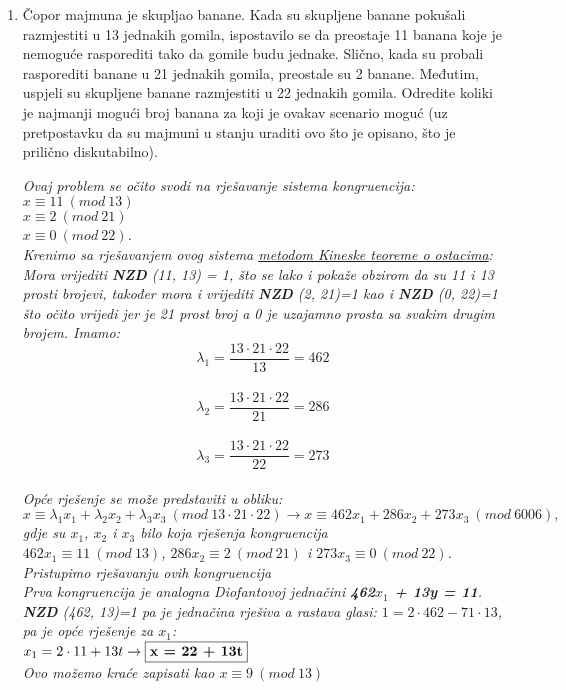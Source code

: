 \documentclass[12pt]{article}
\begin{document}
\begin{enumerate}
	    \item Čopor majmuna je skupljao banane. Kada su skupljene banane pokušali razmjestiti u 13 jednakih gomila, ispostavilo se da preostaje 11 banana koje je nemoguće rasporediti tako da gomile budu jednake. Slično, kada su probali rasporediti banane u 21 jednakih gomila, preostale su 2 banane. Međutim, uspjeli su skupljene banane razmjestiti u 22 jednakih gomila. Odredite koliki je najmanji mogući broj banana za koji je ovakav scenario moguć (uz pretpostavku da su majmuni u stanju uraditi ovo što je opisano, što je prilično diskutabilno).
        \begin{center}
        \textit{Ovaj problem se očito svodi na rješavanje sistema kongruencija:\\$x \equiv 11\ (mod\ 13)$\\$x \equiv 2\ (mod\ 21)$\\$x \equiv 0\ (mod\ 22)$.}\\
        \vspace*{0.75cm}
            \textit{Krenimo sa rješavanjem ovog sistema \underline{metodom Kineske teoreme o ostacima}:\\Mora vrijediti \textbf{NZD} (11, 13) = 1, što se lako i pokaže obzirom da su 11 i 13 prosti brojevi, također mora i vrijediti  \textbf{NZD} (2, 21)=1 kao i  \textbf{NZD} (0, 22)=1 što očito vrijedi jer je 21 prost broj a 0 je uzajamno prosta sa svakim drugim brojem. Imamo:\\$$\lambda_1 = \frac{13 \cdot 21 \cdot 22}{13} = 462$$\\$$\lambda_2 = \frac{13 \cdot 21 \cdot 22}{21} = 286$$\\$$\lambda_3 = \frac{13 \cdot 21 \cdot 22}{22} = 273$$\\Opće rješenje se može predstaviti u obliku: \\$x\equiv \lambda_1 x_1 + \lambda_2 x_2 + \lambda_3 x_3\ (mod\ 13\cdot21\cdot22) \rightarrow x \equiv 462x_1 + 286x_2 + 273x_3\ (mod\ 6006),$ gdje su $x_1$, $x_2$ i $x_3$ bilo koja rješenja kongruencija \\ $462x_1 \equiv 11\ (mod\ 13)$, $286x_2 \equiv 2\ (mod\ 21)$ i $273x_3 \equiv 0\ (mod\ 22)$.\\}
             \vspace*{0.75cm}
            \textit{Pristupimo rješavanju ovih kongruencija\\ Prva kongruencija je analogna Diofantovoj jednačini \textbf{462$x_1$ + 13y = 11}.\\  \textbf{NZD} (462, 13)=1 pa je jednačina rješiva a rastava glasi: $1 = 2\cdot462 - 71\cdot13$, pa je opće rješenje za $x_1$:\\$x_1 = 2 \cdot 11 + 13t \rightarrow \textbf{\fbox{x = 22 + 13t}}$\\Ovo možemo kraće zapisati kao $x\equiv 9\ (mod\ 13)$\\}

\end{center}
\end{enumerate}
\end{document}
